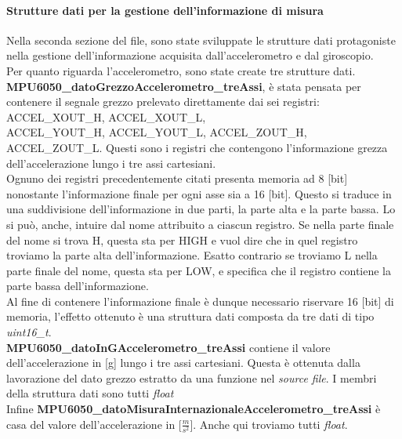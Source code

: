 \documentclass[11pt]{report}
\begin{document}
\paragraph{Strutture dati per la gestione dell'informazione di misura}
Nella seconda sezione del file, sono state sviluppate le strutture dati protagoniste nella gestione dell'informazione acquisita dall'accelerometro e dal giroscopio.\\
Per quanto riguarda l'accelerometro, sono state create tre strutture dati.\\
\textbf{MPU6050\_datoGrezzoAccelerometro\_treAssi}, è stata pensata per contenere il segnale grezzo prelevato direttamente dai sei registri: ACCEL\_XOUT\_H, ACCEL\_XOUT\_L,\\ACCEL\_YOUT\_H, ACCEL\_YOUT\_L, ACCEL\_ZOUT\_H, ACCEL\_ZOUT\_L. Questi sono i registri che contengono l'informazione grezza dell'accelerazione lungo i tre assi 
cartesiani.\\  
Ognuno dei registri precedentemente citati presenta memoria ad 8 [bit] nonostante l'informazione finale per ogni asse sia a 16 [bit]. Questo si traduce in una suddivisione  dell'informazione in due parti, la parte alta e la parte bassa. Lo si può, anche, intuire dal nome attribuito a ciascun registro. Se nella parte finale del nome si trova H, questa sta per HIGH e vuol dire che in quel registro troviamo la parte alta dell'informazione. Esatto contrario se troviamo L nella parte finale del nome, questa sta per LOW, e specifica che il registro contiene la parte bassa dell'informazione.\\
Al fine di contenere l'informazione finale è dunque necessario riservare 16 [bit] di memoria, l'effetto ottenuto è una struttura dati composta da tre dati di tipo \textit{uint16\_t}.\\
\textbf{MPU6050\_datoInGAccelerometro\_treAssi} contiene il valore dell'accelerazione in [g] lungo i tre assi cartesiani. Questa è ottenuta dalla lavorazione del dato grezzo estratto da una funzione nel \textit{source file}. I membri della struttura dati sono tutti \textit{float}\\
Infine \textbf{MPU6050\_datoMisuraInternazionaleAccelerometro\_treAssi} è casa del valore dell'accelerazione in [$\frac{m}{s^2}$]. Anche qui troviamo tutti \textit{float}.
\end{document}

